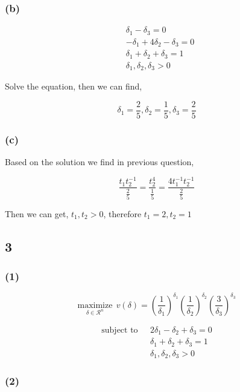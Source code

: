 \documentclass{article}
\begin{document}
\subsubsection*{(b)}


\[
\begin{split}
& \delta_1 - \delta_3 = 0 \\ 
& -\delta_1 + 4\delta_2 - \delta_3 = 0 \\ 
& \delta_1 + \delta_2 + \delta_3 = 1 \\
& \delta_1, \delta_2, \delta_3 > 0
\end{split}
\]


Solve the equation, then we can find,

$$\delta_1 = \frac{2}{5}, \delta_2 = \frac{1}{5}, \delta_3 = \frac{2}{5}$$

\subsubsection*{(c)}

Based on the solution we find in previous question,

$$\frac{t_1t_2^{-1}}{\frac{2}{5}}=\frac{t_2^4}{\frac{1}{5}}=\frac{4t_1^{-1}t_2^{-1}}{\frac{2}{5}}$$

Then we can get, $t_1, t_2 > 0$, therefore $t_1 = 2, t_2=1$

\subsection*{3}

\subsubsection*{(1)}

$$\underset{\delta \in \mathcal{R}^n}{\text{maximize}} \ \  v(\delta) = \left(\frac{1}{\delta_1}\right)^{\delta_1}\left(\frac{1}{\delta_2}\right)^{\delta_2}\left(\frac{3}{\delta_3}\right)^{\delta_3}$$

\[
\begin{split}
\text{subject to}\ \ \ & 2\delta_1 - \delta_2 + \delta_3 = 0 \\ 
& \delta_1 + \delta_2 + \delta_3 = 1 \\
& \delta_1, \delta_2, \delta_3 > 0
\end{split}
\]

\subsubsection*{(2)}
\end{document}
